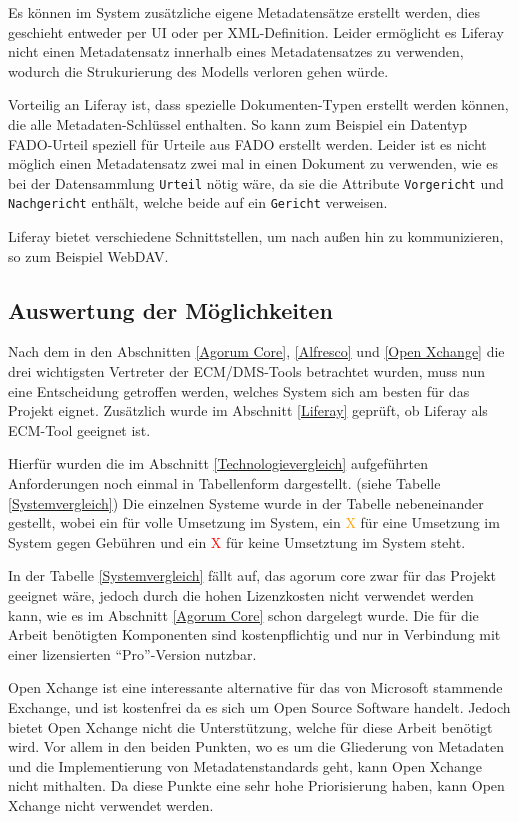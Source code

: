 Es k\"onnen im System zus\"atzliche eigene Metadatens\"atze erstellt werden, dies geschieht entweder per \ac{UI} oder per XML-Definition.
Leider erm\"oglicht es  Liferay nicht einen Metadatensatz innerhalb eines Metadatensatzes zu verwenden, wodurch die Strukurierung des Modells verloren gehen w\"urde.

Vorteilig an Liferay ist, dass spezielle Dokumenten-Typen erstellt werden k\"onnen, die alle Metadaten-Schl\"ussel enthalten. So kann zum Beispiel ein Datentyp \ac{FADO}-Urteil speziell f\"ur Urteile aus \ac{FADO} erstellt werden. Leider ist es nicht m\"oglich einen Metadatensatz zwei mal in einen Dokument zu verwenden, wie es bei der Datensammlung \texttt{Urteil} n\"otig w\"are, da sie die Attribute \texttt{Vorgericht} und \texttt{Nachgericht} enth\"alt, welche beide auf ein \texttt{Gericht} verweisen.

Liferay bietet verschiedene Schnittstellen, um nach au\ss{}en hin zu kommunizieren, so zum Beispiel WebDAV.

\subsection{Auswertung der M\"oglichkeiten}\label{Auswertung ECM}
Nach dem in den Abschnitten \ref{Agorum Core}, \ref{Alfresco} und \ref{Open Xchange} die drei wichtigsten Vertreter der \ac{ECM}/\ac{DMS}-Tools
betrachtet wurden, muss nun eine Entscheidung getroffen werden, welches System sich am besten f\"ur das Projekt eignet. Zus\"atzlich wurde im Abschnitt \ref{Liferay} gepr\"uft, ob Liferay als ECM-Tool geeignet ist.

Hierf\"ur wurden die im Abschnitt \ref{Technologievergleich} aufgef\"uhrten Anforderungen noch einmal in Tabellenform dargestellt. (siehe Tabelle \ref{Systemvergleich}) Die einzelnen Systeme wurde in der Tabelle nebeneinander gestellt, wobei ein \textcolor{green}{\checkmark} f\"ur volle Umsetzung im System, ein \textcolor{orange}{\checkmark X} f\"ur eine Umsetzung im System gegen Geb\"uhren und ein \textcolor{red}{X} f\"ur keine Umsetztung im System steht.

In der Tabelle \ref{Systemvergleich} f\"allt auf, das agorum core zwar f\"ur das Projekt geeignet w\"are, jedoch durch die hohen Lizenzkosten nicht verwendet werden kann, wie es im Abschnitt \ref{Agorum Core} schon dargelegt wurde. Die f\"ur die Arbeit ben\"otigten Komponenten sind kostenpflichtig und nur in Verbindung mit einer lizensierten "`Pro"'-Version nutzbar.

Open Xchange ist eine interessante alternative f\"ur das von Microsoft stammende Exchange, und ist kostenfrei da es sich um Open Source Software handelt. Jedoch bietet Open Xchange nicht die Unterst\"utzung, welche f\"ur diese Arbeit ben\"otigt wird. Vor allem in den beiden Punkten, wo es um die Gliederung von Metadaten und die Implementierung von Metadatenstandards geht, kann Open Xchange nicht mithalten. Da diese Punkte eine sehr hohe Priorisierung haben, kann Open Xchange nicht verwendet werden.

